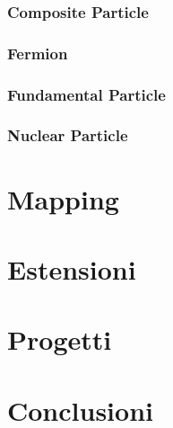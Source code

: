\documentclass[12pt,a4paper,openright,twoside]{book}
\begin{document}
\subsection{Composite Particle}
\subsection{Fermion}
\subsection{Fundamental Particle}
\subsection{Nuclear Particle}

\chapter{Mapping} %
\label{chap:mapping}

\chapter{Estensioni} %
\label{chap:extensions}

\chapter{Progetti} %
\label{chap:projects}

\chapter{Conclusioni}
\label{chap:conclusions}





\end{document}
